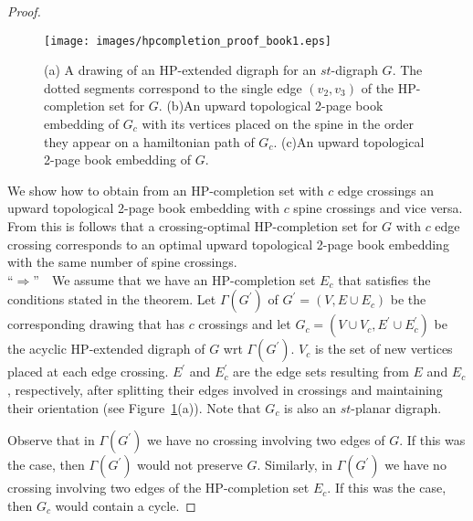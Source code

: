 \documentclass{myllncs-mixalis}
\begin{document}
\begin{proof}

\begin{figure}[htb]
    \begin{minipage}{\textwidth}
    \centering
    \texttt{[image: images/hpcompletion\_proof\_book1.eps]}
    \caption{(a) A drawing of an HP-extended digraph for an  $st$-digraph $G$.
     The dotted segments correspond to the single edge $(v_2, v_3)$ of the HP-completion set for $G$.
     (b)An upward topological 2-page book embedding of $G_c$ with
     its
     vertices   placed on the spine in the order they appear
     on a hamiltonian path of $G_c$.
     (c)An upward topological 2-page book embedding of $G$. }
    \label{fig:HPcompletionExample}
  \end{minipage}
\end{figure}

We  show how to obtain from an HP-completion set with $c$ edge
crossings  an upward topological 2-page book embedding with $c$
spine crossings and vice versa. From this is follows that   a
crossing-optimal  HP-completion set for $G$ with $c$ edge crossing
corresponds to an optimal upward
topological 2-page book embedding  with the same number of spine crossings.\\
``$\Rightarrow$''$~~~$ We assume that we have an HP-completion set
$E_c$  that satisfies the conditions stated in the theorem. Let
$\Gamma(G^\prime)$ of $G^\prime=(V,E \cup E_c)$ be the corresponding
 drawing that has $c$ crossings and let $G_c=(V\cup V_c,
E^\prime \cup E_c^\prime)$ be the acyclic HP-extended digraph of $G$
wrt $\Gamma(G^\prime)$.   $V_c$ is the set of new vertices placed at
each edge crossing. $E^\prime$  and $E_c^\prime$ are the edge sets
resulting from $E$ and $E_c$,
 respectively, after splitting their edges
 involved in crossings and maintaining their orientation
 (see Figure~\ref{fig:HPcompletionExample}(a)). Note that $G_c$ is also an $st$-planar digraph.


 Observe that in $\Gamma(G^\prime)$ we have no crossing involving two edges of $G$.
 If this was the
 case, then $\Gamma(G^\prime)$ would not preserve $G$.
 Similarly, in $\Gamma(G^\prime)$ we have no crossing involving two edges of the HP-completion set $E_c$.
 If this was the
 case, then $G_c$ would contain a cycle.


\end{proof}
\end{document}
